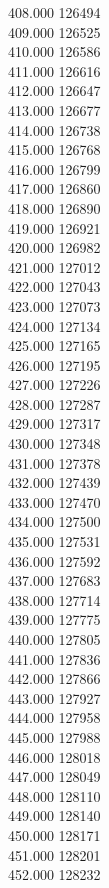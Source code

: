 { 408.000	126494 \\
 409.000	126525 \\
 410.000	126586 \\
 411.000	126616 \\
 412.000	126647 \\
 413.000	126677 \\
 414.000	126738 \\
 415.000	126768 \\
 416.000	126799 \\
 417.000	126860 \\
 418.000	126890 \\
 419.000	126921 \\
 420.000	126982 \\
 421.000	127012 \\
 422.000	127043 \\
 423.000	127073 \\
 424.000	127134 \\
 425.000	127165 \\
 426.000	127195 \\
 427.000	127226 \\
 428.000	127287 \\
 429.000	127317 \\
 430.000	127348 \\
 431.000	127378 \\
 432.000	127439 \\
 433.000	127470 \\
 434.000	127500 \\
 435.000	127531 \\
 436.000	127592 \\
 437.000	127683 \\
 438.000	127714 \\
 439.000	127775 \\
 440.000	127805 \\
 441.000	127836 \\
 442.000	127866 \\
 443.000	127927 \\
 444.000	127958 \\
 445.000	127988 \\
 446.000	128018 \\
 447.000	128049 \\
 448.000	128110 \\
 449.000	128140 \\
 450.000	128171 \\
 451.000	128201 \\
 452.000	128232 \\
}
